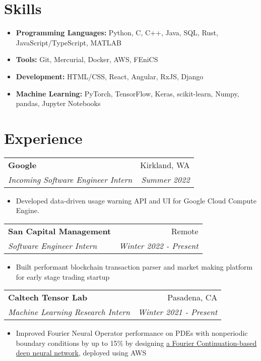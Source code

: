 \documentclass[letterpaper,11pt]{article}
\makeatletter
\newcommand{\resitem}[1]{\item[--] #1}
\newcommand{\ressubheading}[4]{
	\begin{tabular*}{7.5in}{l@{\extracolsep{\fill}}r}
			\textbf{#1} & #2 \\
			\textit{#3} & \textit{#4}
	\end{tabular*}
}
\makeatother
\begin{document}


\section{Skills}

\vspace{6pt}
\begin{itemize}
	\resitem{
		\textbf{Programming Languages:} Python, C, C++, Java, SQL, Rust,
		JavaScript/TypeScript, MATLAB
	}
	\resitem{\textbf{Tools:} Git, Mercurial, Docker, AWS, FEniCS}
	\resitem{\textbf{Development:} HTML/CSS, React, Angular, RxJS, Django}
	\resitem{
		\textbf{Machine Learning:} PyTorch, TensorFlow, Keras, scikit-learn,
		Numpy, pandas, Jupyter Notebooks
	}
\end{itemize}

\section{Experience}
\ressubheading{Google}{Kirkland, WA}{Incoming Software Engineer Intern}
{Summer 2022}
\begin{itemize}
	\resitem{
		Developed data-driven usage warning API and UI for Google
		Cloud Compute Engine.
	}
\end{itemize}

\ressubheading{San Capital Management}{Remote}{Software Engineer Intern}
{Winter 2022 - Present}
\begin{itemize}[leftmargin=*]
	\resitem{
		Built performant blockchain transaction parser and market making
		platform for early stage trading startup
	}
\end{itemize}

\ressubheading{Caltech Tensor Lab}{Pasadena, CA}{Machine Learning Research Intern}{Winter 2021 - Present}
\begin{itemize}[leftmargin=*]
	\resitem{Improved Fourier Neural Operator performance on PDEs with nonperiodic boundary conditions by up to 15\% by designing \href{https://symposium.foragerone.com/caltech-sfp-summer-seminar-day-2021/presentations/32348}{a Fourier Continuation-based deep neural network}, deployed using AWS}
\end{itemize}
\end{document}
